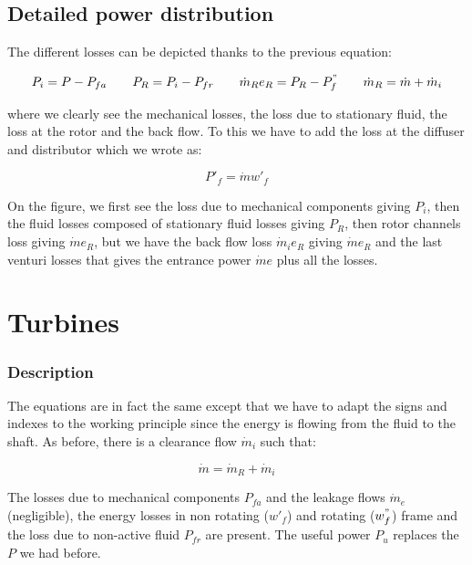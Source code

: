 \subsection{Detailed power distribution}
The different losses can be depicted thanks to the previous equation:

\begin{equation}
P_i = P-P_{fa} \qquad P_R = P_i - P_{fr} \qquad \dot{m}_Re_R = P_R - P^"_{f} \qquad \dot{m}_R = \dot{m} + \dot{m}_i
\end{equation}

where we clearly see the mechanical losses, the loss due to stationary fluid, the loss at the rotor and the back flow. To this we have to add the loss at the diffuser and distributor which we wrote as:

\begin{equation}
P'_f = \dot{m}w'_f
\end{equation}

On the figure, we first see the loss due to mechanical components giving $P_i$, then the fluid losses composed of stationary fluid losses giving $P_R$, then rotor channels loss giving $\dot{m}e_R$, but we have the back flow loss $\dot{m}_i e_R$ giving $\dot{m}e_R$ and the last venturi losses that gives the entrance power $\dot{m}e$ plus all the losses. 

\section{Turbines}
\subsubsection{Description}
The equations are in fact the same except that we have to adapt the signs and indexes to the working principle since the energy is flowing from the fluid to the shaft. As before, there is a clearance flow $\dot{m}_i$ such that: 

\begin{equation}
\dot{m} = \dot{m}_R + \dot{m}_i
\end{equation}

The losses due to mechanical components $P_{fa}$ and the leakage flows $\dot{m}_e$ (negligible), the energy losses in non rotating ($w'_f$) and rotating ($w^"_f$) frame and the loss due to non-active fluid $P_{fr}$ are present. The useful power $P_u$ replaces the $P$ we had before. 

